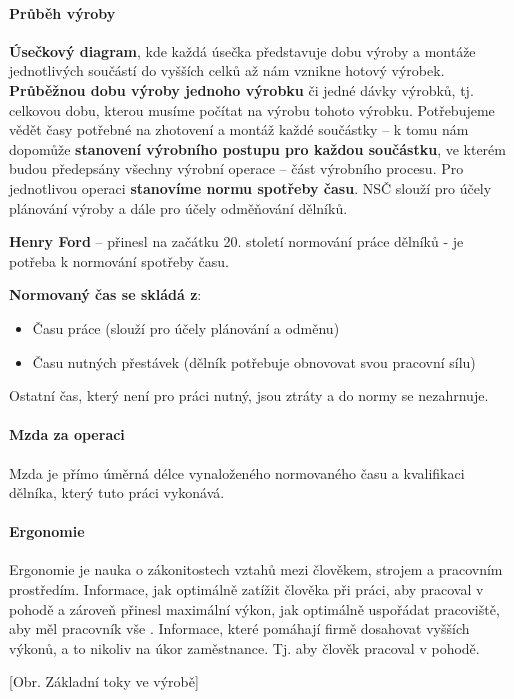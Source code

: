 \documentclass[11pt,a4paper,twoside]{book}
\begin{document}
	\paragraph*{Průběh výroby}
	\textbf{Úsečkový diagram}, kde každá úsečka představuje dobu výroby a montáže jednotlivých součástí do vyšších celků až nám vznikne hotový výrobek.
	\textbf{Průběžnou dobu výroby jednoho výrobku} či jedné dávky výrobků, tj. celkovou dobu, kterou musíme počítat na výrobu tohoto výrobku. Potřebujeme vědět časy potřebné na zhotovení a montáž každé součástky -- k tomu nám dopomůže \textbf{stanovení výrobního postupu pro každou součástku}, ve kterém budou předepsány všechny výrobní operace -- část výrobního procesu. Pro jednotlivou operaci \textbf{stanovíme normu spotřeby času}. NSČ slouží pro účely plánování výroby a dále pro účely odměňování dělníků.

	\textbf{Henry Ford} -- přinesl na začátku 20. století normování práce dělníků - je potřeba k normování spotřeby času.

	\textbf{Normovaný čas se skládá z}:
	\begin{itemize}
		\item Času práce (slouží pro účely plánování a odměnu)
		\item Času nutných přestávek (dělník potřebuje obnovovat svou pracovní sílu)
	\end{itemize}

	Ostatní čas, který není pro práci nutný, jsou ztráty a do normy se nezahrnuje.

	\paragraph*{Mzda za operaci}
	Mzda je přímo úměrná délce vynaloženého normovaného času a kvalifikaci dělníka, který tuto práci vykonává.

	\paragraph*{Ergonomie}
	Ergonomie je nauka o zákonitostech vztahů mezi člověkem, strojem a pracovním prostředím. Informace, jak optimálně zatížit člověka při práci, aby pracoval v pohodě a zároveň přinesl maximální výkon, jak optimálně uspořádat pracoviště, aby měl pracovník vše . Informace, které pomáhají firmě dosahovat vyšších výkonů, a to nikoliv na úkor zaměstnance. Tj. aby člověk pracoval v pohodě.

	[Obr. Základní toky ve výrobě]
\end{document}
